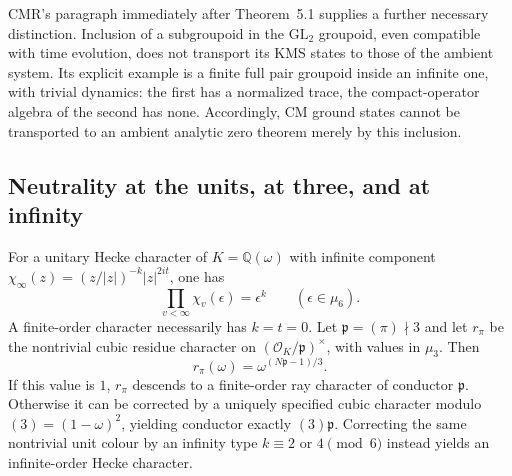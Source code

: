 CMR's paragraph immediately after Theorem~5.1 supplies a further
necessary distinction. Inclusion of a subgroupoid in the
$\mathrm{GL}_2$ groupoid, even compatible with time evolution,
does not transport its KMS states to those of the ambient
system. Its explicit example is a finite full pair groupoid
inside an infinite one, with trivial dynamics: the first has
a normalized trace, the compact-operator algebra of the
second has none. Accordingly, CM ground states cannot be
transported to an ambient analytic zero theorem merely by
this inclusion.

\subsection{Neutrality at the units, at three, and at infinity}

\begin{proposition}
\label{AC-B04}
For a unitary Hecke character of $K=\mathbb Q(\omega)$ with
infinite component
$\chi_\infty(z)=(z/|z|)^{-k}|z|^{2it}$, one has
\[
             \prod_{v<\infty}\chi_v(\epsilon)=\epsilon^k
                         \qquad(\epsilon\in\mu_6).          \tag{B4.1}
\]
A finite-order character necessarily has $k=t=0$.
Let $\mathfrak p=(\pi)\nmid3$ and let $r_\pi$ be the
nontrivial cubic residue character on
$(\mathcal O_K/\mathfrak p)^\times$, with values in $\mu_3$.
Then
\[
       r_\pi(\omega)=\omega^{(N\mathfrak p-1)/3}.            \tag{B4.2}
\]
If this value is $1$, $r_\pi$ descends to a finite-order ray
character of conductor $\mathfrak p$. Otherwise it can be
corrected by a uniquely specified cubic character modulo
$(3)=(1-\omega)^2$, yielding conductor exactly
$(3)\mathfrak p$. Correcting the same nontrivial unit colour
by an infinity type $k\equiv2$ or $4\pmod6$ instead yields
an infinite-order Hecke character.
\end{proposition}
